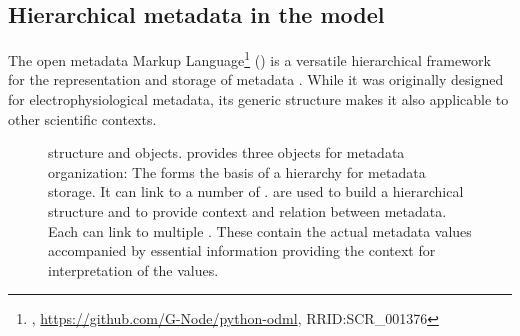 \subsection{Hierarchical metadata in the  model}
\label{sec:odml}

The open metadata Markup Language\footnote{, \url{https://github.com/G-Node/python-odml}, RRID:SCR\_001376} () is a versatile hierarchical framework for the representation and storage of metadata \citep{Grewe_2011}. While it was originally designed for electrophysiological metadata, its generic structure makes it also applicable to other scientific contexts.\\

\begin{figure}[hbt!]
    \centering
    
    \caption[ structure and objects]{ structure and objects.  provides three objects for metadata organization: The   forms the basis of a hierarchy for metadata storage. It can link to a number of  .  are used to build a hierarchical structure and to provide context and relation between metadata. Each  can link to multiple . These contain the actual metadata values accompanied by essential information providing the context for interpretation of the values.}
    \label{fig:intro_odML_structure}
\end{figure}

